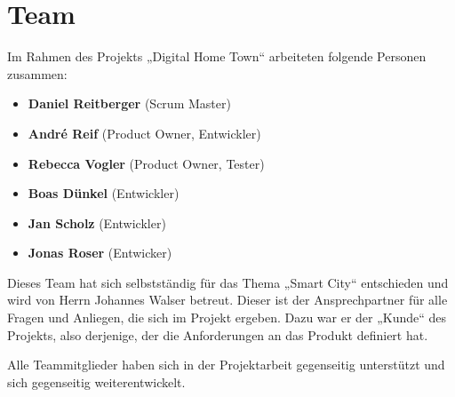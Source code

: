 \section{Team}
\label{sec:project-team}

Im Rahmen des Projekts „Digital Home Town“ arbeiteten folgende Personen zusammen:

\begin{itemize}
  \item \textbf{Daniel Reitberger} (Scrum Master)
  \item \textbf{André Reif} (Product Owner, Entwickler)
  \item \textbf{Rebecca Vogler} (Product Owner, Tester)
  \item \textbf{Boas Dünkel} (Entwickler)
  \item \textbf{Jan Scholz} (Entwickler)
  \item \textbf{Jonas Roser} (Entwicker)
\end{itemize}

Dieses Team hat sich selbstständig für das Thema „Smart City“ entschieden und wird von Herrn Johannes Walser betreut.
Dieser ist der Ansprechpartner für alle Fragen und Anliegen, die sich im Projekt ergeben.
Dazu war er der „Kunde“ des Projekts, also derjenige, der die Anforderungen an das Produkt definiert hat.

Alle Teammitglieder haben sich in der Projektarbeit gegenseitig unterstützt und sich gegenseitig weiterentwickelt.
